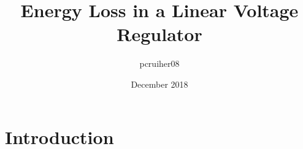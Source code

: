\documentclass{article}
\title{Energy Loss in a Linear Voltage Regulator}
\author{pcruiher08 }
\date{December 2018}
\begin{document}
\maketitle

\section{Introduction}
\end{document}
